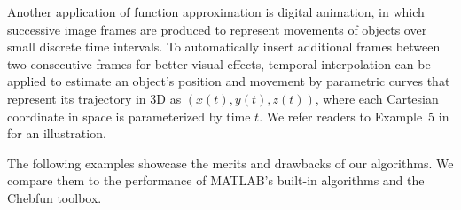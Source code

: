 \documentclass[review]{elsarticle}
\newcommand{\abstol}{\varepsilon}
\theoremstyle{definition}
\newcommand{\cosappx}{\widehat{\operatorname*{cos}}}
\newcommand{\sinappx}{\widehat{\operatorname*{sin}}}
\begin{document}
\begin{comment}
Denote $\sinappx(x)$ and $\cosappx (x)$ the approximate functions of $\sin(x)$ and
$\cos(x)$ on the interval $[0,4\pi]$, respectively; and let the resultant
approximants of $x(u,v)$, $y(u,v)$, and $z(u,v)$ be $\hat{x}(u,v)$,
$\hat{y}(u,v)$, and $\hat{z}(u,v)$, respectively.
Then we have
\begin{align*}
   \hat{x}(u,v) & =  \left[a\left(1-\frac{v}{2\pi}\right)\left(1+\cosappx(u)\right) + c\right]\cosappx(nv),
\\ \hat{y}(u,v) & = \left[a\left(1-\frac{v}{2\pi}\right)(1+\cosappx(u)) + c\right] \sinappx(nv),
\\ \hat{z}(u,v) & = \frac{bv}{2\pi} + a\left(1-\frac{v}{2\pi}\right)\sinappx(u).
\end{align*}
Define the \emph{overall} approximation error measure as the supremum norm
\begin{align*}
   \max\limits_{u,v \in [0, 2 \pi] } & \left\{   |x(u,v)-\hat{x}(u,v)|,\right.
   \left.  |y(u,v)-\hat{y}(u,v)|,
                                  \ \    |z(u,v)-\hat{z}(u,v)|\right\}.
\end{align*}
Even if we set the error tolerance $\abstol$ to be as big as $0.1$ for computing
$\sinappx$ and $\cosappx$, we can still obtain a much diminished overall error
in the order of $9 \times 10^{-4}$; see the error plot in
Figure~\ref{fig:funappxseashell}b). The reconstructed surface in
Figure~\ref{fig:funappxseashell}a) is very similar to the original seashell
image.
\end{exmp}
\end{comment}

Another application of function approximation is digital animation, in which
successive image frames are produced to represent movements of objects over
small discrete time intervals. To automatically insert additional frames between
two consecutive frames for better visual effects, temporal interpolation can be
applied to estimate an object's position and movement by parametric curves that
represent its trajectory in 3D as $(x(t), y(t), z(t))$, where each Cartesian
coordinate in space is parameterized by time $t$. We refer readers to Example~5
in \cite[Chapter~3, Section~6]{Din15a} for an illustration.


The following examples showcase the merits and drawbacks of our algorithms. We
compare them to the performance of MATLAB's built-in algorithms and the Chebfun
toolbox.
\end{document}
